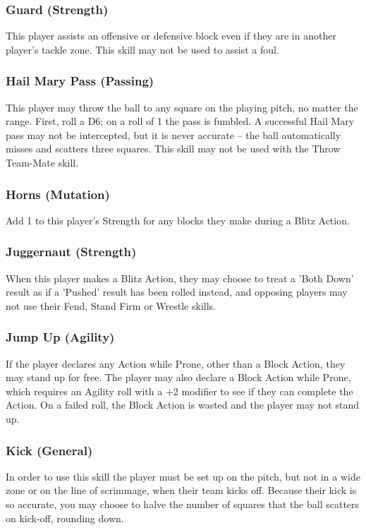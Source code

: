 \begin{multicols}{3}
\subsubsection{Guard (Strength)}
\par This player assists an offensive or defensive block even if they are in another player's tackle zone. This skill may not be used to assist a foul.

\subsubsection{Hail Mary Pass (Passing)}
\par This player may throw the ball to any square on the playing pitch, no matter the range. First, roll a D6; on a roll of 1 the pass is fumbled. A successful Hail Mary pass may not be intercepted, but it is never accurate – the ball automatically misses and scatters three squares. This skill may not be used with the Throw Team-Mate skill.

\subsubsection{Horns (Mutation)}
\par Add 1 to this player's Strength for any blocks they make during a Blitz Action.

\subsubsection{Juggernaut (Strength)}
\par When this player makes a Blitz Action, they may choose to treat a 'Both Down' result as if a 'Pushed' result has been rolled instead, and opposing players may not use their Fend, Stand Firm or Wrestle skills.

\subsubsection{Jump Up (Agility)}
\par If the player declares any Action while Prone, other than a Block Action, they may stand up for free. The player may also declare a Block Action while Prone, which requires an Agility roll with a +2 modifier to see if they can complete the Action. On a failed roll, the Block Action is wasted and the player may not stand up.

\subsubsection{Kick (General)}
\par In order to use this skill the player must be set up on the pitch, but not in a wide zone or on the line of scrimmage, when their team kicks off. Because their kick is so accurate, you may choose to halve the number of squares that the ball scatters on kick-off, rounding down.


\end{multicols}
